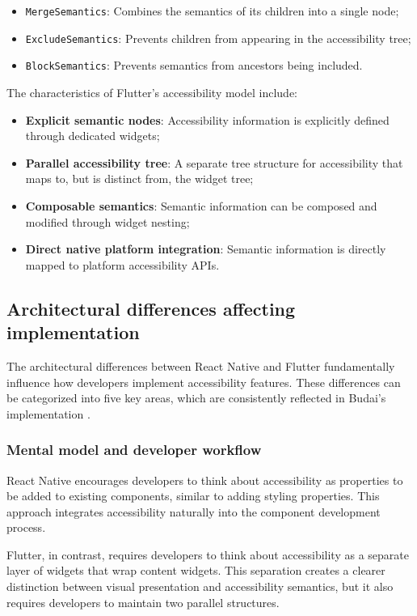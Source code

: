 \begin{itemize}
    \item \texttt{MergeSemantics}: Combines the semantics of its children into a single node;
    \item \texttt{ExcludeSemantics}: Prevents children from appearing in the accessibility tree;
    \item \texttt{BlockSemantics}: Prevents semantics from ancestors being included.
\end{itemize}

The characteristics of Flutter's accessibility model include:

\begin{itemize}
    \item \textbf{Explicit semantic nodes}: Accessibility information is explicitly defined through dedicated widgets;
    \item \textbf{Parallel accessibility tree}: A separate tree structure for accessibility that maps to, but is distinct from, the widget tree;
    \item \textbf{Composable semantics}: Semantic information can be composed and modified through widget nesting;
    \item \textbf{Direct native platform integration}: Semantic information is directly mapped to platform accessibility APIs.
\end{itemize}

\subsection{Architectural differences affecting implementation}
\label{subsec:arch-differences}

The architectural differences between React Native and Flutter fundamentally influence how developers implement accessibility features. These differences can be categorized into five key areas, which are consistently reflected in Budai's implementation \cite{budai2024mobile}.

\subsubsection{Mental model and developer workflow}
React Native encourages developers to think about accessibility as properties to be added to existing components, similar to adding styling properties. This approach integrates accessibility naturally into the component development process.

Flutter, in contrast, requires developers to think about accessibility as a separate layer of widgets that wrap content widgets. This separation creates a clearer distinction between visual presentation and accessibility semantics, but it also requires developers to maintain two parallel structures.

